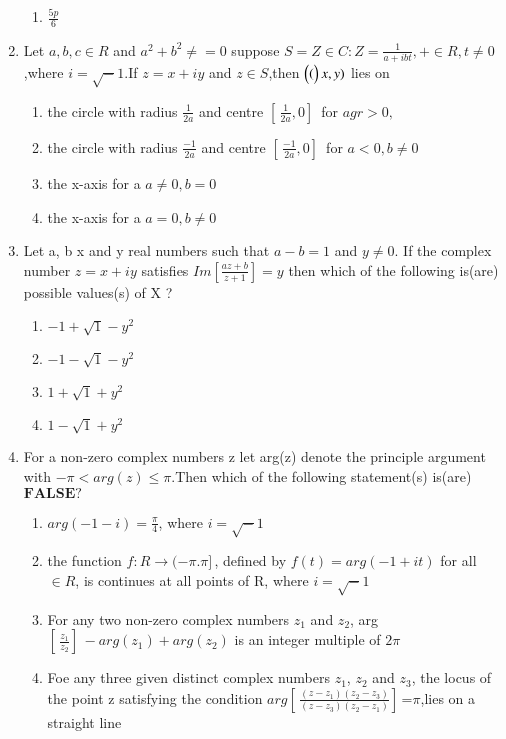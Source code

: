 \begin{enumerate}[label=\arabic*.,ref=\thesubsection.\theenumi]
\begin{enumerate}
    \item  $\frac{5p}{6}$
    \end{enumerate}
    \item Let $a,b,c\in R$ and $a^2+b^2\neq = 0$ 
    suppose $S = {Z \in C:Z=\frac{1}{a+ibt},+ \in R,t \neq0}$,where $i = \sqrt-1$.If $z = x+iy$ and $z\in S $,then $\begin{pmatrix}(\end{pmatrix}x,y)$ lies on
    \begin{enumerate}
    \item the circle with radius $\frac{1}{2a}$ and centre $[ \,\frac{1}{2a},0] \,$ for $agr > 0,$	 
    \item  the circle with radius $\frac{-1}{2a}$ and centre $[ \,\frac{-1}{2a},0] \,$ for $a < 0, b\neq 0$
    \item  the x-axis for a $a\neq 0,b=0$
    \item   the x-axis for a $a=0,b\neq 0$
    \end{enumerate}
    \item Let a, b x and y real numbers such that $a-b=1$ and $y\neq 0$. If the complex number $z=x+iy$ satisfies $Im[\frac {az+b}{z+1}] = y$ then which of the following  is(are) possible values(s) of X ?
    \begin{enumerate}
    \item   $-1+\sqrt1-y^2$ 
    \item   $-1-\sqrt1-y^2$
    \item   $1+\sqrt1+y^2$ 
    \item   $1-\sqrt1+y^2$
    \end{enumerate}
    \item For a non-zero complex numbers z let arg(z) denote the principle argument with $-\pi < arg(z)\leq\pi$.Then which of the following statement(s) is(are) $\boldsymbol{FALSE} ?$
    \begin{enumerate}
    \item   $arg(-1-i)=\frac{\pi}{4}$, where $i=\sqrt -1$ 
    \item   the function $ f :R \longrightarrow(-\pi.\pi] \,$, defined by $f(t)=arg(-1+it)$ for all $\in R$, is continues at all points of R, where $i=\sqrt-1$ 
    \item  For any two non-zero complex numbers $z_1$ and $z_2$,
     arg$[ \,\frac{z_1}{z_2}] \,-arg(z_1)+arg(z_2)$ is an integer multiple of $2\pi$
    \item  Foe any three given distinct complex numbers $z_1$, $z_2$ and $z_3$, the locus of the point z satisfying the condition 
         $arg[ \,\frac{(z-z_1)(z_2-z_3)}{(z-z_3)(z_2-z_1)}] \,$=$\pi$,lies on a straight line

\end{enumerate}
\end{enumerate}
